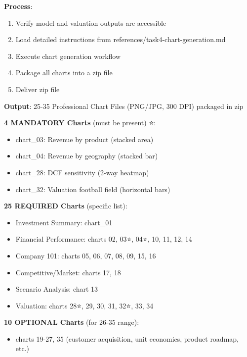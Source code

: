 \documentclass[11pt]{article}
\begin{document}
\textbf{Process}:

\begin{enumerate}[leftmargin=*,itemsep=2pt,topsep=2pt]
\item {} Verify model and valuation outputs are accessible
\item {} Load detailed instructions from references/task4-chart-generation.md
\item {} Execute chart generation workflow
\item {} Package all charts into a zip file
\item {} Deliver zip file
\end{enumerate}

\textbf{Output}: 25-35 Professional Chart Files (PNG/JPG, 300 DPI) packaged in zip


\textbf{4 MANDATORY Charts} (must be present) ⭐:

\begin{itemize}[leftmargin=*,itemsep=2pt,topsep=2pt]
\item {} chart\_\allowbreak{}03: Revenue by product (stacked area)
\item {} chart\_\allowbreak{}04: Revenue by geography (stacked bar)
\item {} chart\_\allowbreak{}28: DCF sensitivity (2-way heatmap)
\item {} chart\_\allowbreak{}32: Valuation football field (horizontal bars)
\end{itemize}

\textbf{25 REQUIRED Charts} (specific list):

\begin{itemize}[leftmargin=*,itemsep=2pt,topsep=2pt]
\item {} Investment Summary: chart\_\allowbreak{}01
\item {} Financial Performance: charts 02, 03⭐, 04⭐, 10, 11, 12, 14
\item {} Company 101: charts 05, 06, 07, 08, 09, 15, 16
\item {} Competitive/Market: charts 17, 18
\item {} Scenario Analysis: chart 13
\item {} Valuation: charts 28⭐, 29, 30, 31, 32⭐, 33, 34
\end{itemize}

\textbf{10 OPTIONAL Charts} (for 26-35 range):

\begin{itemize}[leftmargin=*,itemsep=2pt,topsep=2pt]
\item {} charts 19-27, 35 (customer acquisition, unit economics, product roadmap, etc.)
\end{itemize}
\end{document}
